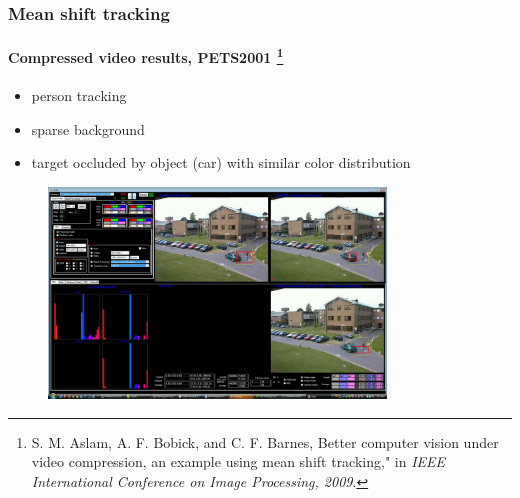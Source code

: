 \begin{frame}
\frametitle{Mean shift tracking}
\framesubtitle{Compressed video results, PETS2001 \tiny{\footnote{S. M. Aslam, A. F. Bobick, and C. F. Barnes, Better computer vision under video compression, an example using mean shift tracking," in \emph{IEEE International Conference on Image Processing, 2009}.}}} 
\logoCSIPCPL\mypagenum
	\begin{itemize}
		\item person tracking
		\item sparse background
		\item target occluded by object (car) with similar color distribution
	\end{itemize}
	\begin{figure}
		\includegraphics[width=0.8\textwidth]{figs/ICIP2009_PETS2001_FN_00592_snapshotVVG.pdf}
	\end{figure}
\end{frame}


